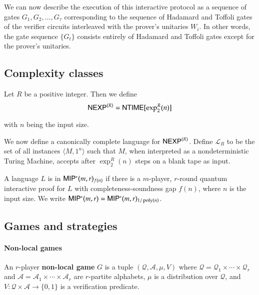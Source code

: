 We can now describe the execution of this interactive protocol as a sequence of gates $G_1,G_2,\ldots,G_\tau$ corresponding to the sequence of Hadamard and Toffoli gates of the verifier circuits interleaved with the prover's unitaries $W_i$. In other words, the gate sequence $\{G_t\}$ consists entirely of Hadamard and Toffoli gates except for the prover's unitaries. %

\subsection{Complexity classes}

\begin{definition}
	Let $R$ be a positive integer. Then we define
	\[
		{\sf NEXP}^{(R)} = {\sf NTIME}[\exp^R_2(n)]
	\]
\end{definition}
with $n$ being the input size. 

We now define a canonically complete language for ${\sf NEXP}^{(R)}$. Define $\mathcal{L}_R$ to be the set of all instances $\langle M, 1^n \rangle$ such that $M$, when interpreted as a nondeterministic Turing Machine, accepts after $\exp^R_2(n)$ steps on a blank tape as input.

\begin{definition}[$\MIPstar$]
	A language $L$ is in ${\sf MIP^*}(m,r)_{f(n)}$ if there is a $m$-player, $r$-round quantum interactive proof for $L$ with completeness-soundness gap $f(n)$, where $n$ is the input size. We write ${\sf MIP^*}(m,r) = {\sf MIP^*}(m,r)_{1/\operatorname{poly}(n)}$.
\end{definition}

\subsection{Games and strategies}

\paragraph{Non-local games} An $r$-player \textbf{non-local game} $G$ is a tuple $(\mathcal{Q},\mathcal{A},\mu,V)$ where $\mathcal{Q} = \mathcal{Q}_1 \times \cdots \times \mathcal{Q}_r$ and $\mathcal{A} = \mathcal{A}_1 \times \cdots \times \mathcal{A}_r$ are $r$-partite alphabets, $\mu$ is a distribution over $\mathcal{Q}$, and $V: \mathcal{Q} \times \mathcal{A} \to \{0,1\}$ is a verification predicate. 

